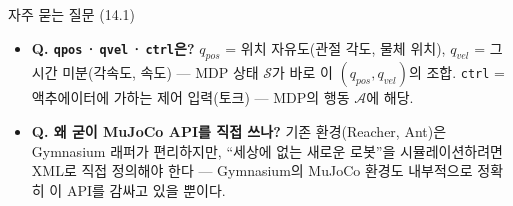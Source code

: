 \begin{frame}{자주 묻는 질문 (14.1)}
  \small
  \begin{itemize}
    \item \textbf{Q. \texttt{qpos}\,·\,\texttt{qvel}\,·\,\texttt{ctrl}은?}
      $q_{pos}$ = 위치 자유도(관절 각도, 물체 위치),
      $q_{vel}$ = 그 시간 미분(각속도, 속도) --- MDP 상태
      $\mathcal{S}$가 바로 이 $(q_{pos}, q_{vel})$의 조합.
      \texttt{ctrl} = 액추에이터에 가하는 제어 입력(토크) ---
      MDP의 행동 $\mathcal{A}$에 해당.
    \item \textbf{Q. 왜 굳이 MuJoCo API를 직접 쓰나?}
      기존 환경(Reacher, Ant)은 Gymnasium 래퍼가 편리하지만,
      ``세상에 없는 새로운 로봇''을 시뮬레이션하려면 XML로 직접
      정의해야 한다 --- Gymnasium의 MuJoCo 환경도 내부적으로
      정확히 이 API를 감싸고 있을 뿐이다.
  \end{itemize}
\end{frame}
